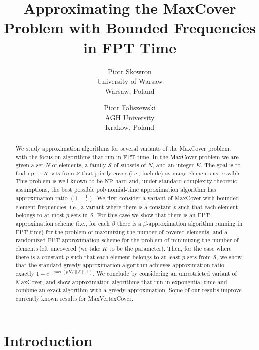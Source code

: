 \documentclass[11pt]{article}
\title{Approximating the MaxCover Problem with Bounded Frequencies in
  FPT Time}
\author{Piotr Skowron\\ 
        University of Warsaw\\
        Warsaw, Poland\\
        \and
        Piotr Faliszewski\\
        AGH University\\
        Krakow, Poland
}
\newcommand{\np}{{\mathrm{NP}}}
\newcommand{\calS}{{{\mathcal{S}}}}
\begin{document}
\maketitle


\begin{abstract}
  We study approximation algorithms for several variants of the
  MaxCover problem, with the focus on algorithms that run in FPT time.
  In the MaxCover problem we are given a set $N$ of elements, a family
  $\calS$ of subsets of $N$, and an integer $K$. The goal is to find
  up to $K$ sets from $\calS$ that jointly cover (i.e., include) as
  many elements as possible. This problem is well-known to be
  $\np$-hard and, under standard complexity-theoretic assumptions, the
  best possible polynomial-time approximation algorithm has
  approximation ratio $(1 - \frac{1}{e})$.  We first consider a variant
  of MaxCover with bounded element frequencies, i.e., a variant where
  there is a constant $p$ such that each element belongs to at most
  $p$ sets in $\calS$.  For this case we show that there is an FPT
  approximation scheme (i.e., for each $\beta$ there is a $\beta$-approximation
  algorithm running in FPT time) for the problem of maximizing the number of
  covered elements, and a randomized FPT approximation scheme for the
  problem of minimizing the number of elements left uncovered (we take
  $K$ to be the parameter). Then, for the case where there is a
  constant $p$ such that each element belongs to at least $p$ sets
  from $\calS$, we show that the standard greedy approximation
  algorithm achieves approximation ratio exactly
  ${1-e^{-\max(pK/\|\calS\|, 1)}}$. We conclude by considering an unrestricted
  variant of MaxCover, and show approximation algorithms that run in
  exponential time and combine an exact algorithm with a greedy
  approximation. Some of our results improve currently known results for
  MaxVertexCover.
\end{abstract}


\section{Introduction}
\end{document}
